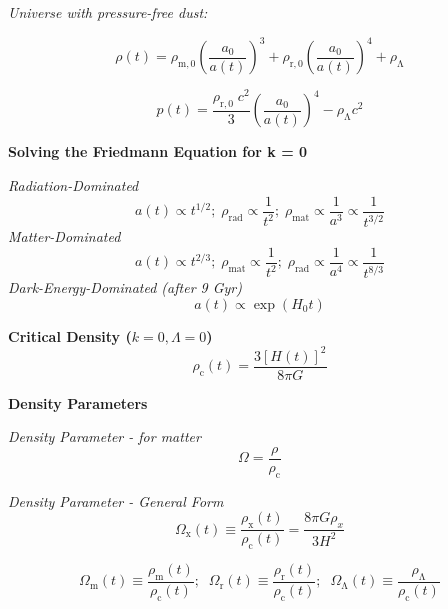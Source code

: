 \documentclass{article}
\begin{document}
\textit {Universe with pressure-free dust:}

\begin{equation}
\rho(t) = \rho_\mathrm{m,0} \left( \frac {a_\mathrm{0}}{a(t)} \right)^3 + \rho_\mathrm{r,0} \left( \frac {a_\mathrm{0}}{a(t)} \right)^4 + \rho_\mathrm{\Lambda}
\end{equation}

\begin{equation}
p(t) = \frac {\rho_\mathrm{r,0} \; c^2}{3} \left( \frac {a_\mathrm{0}}{a(t)} \right)^4 - \rho_\mathrm{\Lambda} c^2
\end{equation}

\textbf {Solving the Friedmann Equation for k = 0}

\textit {Radiation-Dominated}
\begin{equation}
a(t) \propto t^{1/2} ; \; \rho_{\mathrm{rad}} \propto \frac {1}{t^2} ; \; \rho_{\mathrm{mat}} \propto \frac {1}{a^3} \propto \frac {1}{t^{3/2}}
\end{equation}
\textit {Matter-Dominated}
\begin{equation}
a(t) \propto t^{2/3} ; \; \rho_{\mathrm{mat}} \propto \frac {1}{t^2} ; \; \rho_{\mathrm{rad}} \propto \frac {1}{a^4} \propto \frac {1}{t^{8/3}}
\end{equation}
\textit {Dark-Energy-Dominated (after 9 Gyr)}
\begin{equation}
a(t) \propto \exp{(H_\mathrm{0}t)}
\end{equation}


\textbf {Critical Density (\( k = 0, \Lambda = 0 \))}
\begin{equation}
\rho_\mathrm{c}(t) = \frac {{3[H(t)]^2}}{8 \pi G}
\end{equation}

\textbf {Density Parameters}

\textit {Density Parameter - for matter}
\begin{equation}
\Omega = \frac {\rho}{\rho_\mathrm{c}}
\end{equation}

\textit {Density Parameter - General Form}
\begin{equation}
\Omega_\mathrm{x}(t) \equiv \frac {\rho_\mathrm{x}(t)}{\rho_\mathrm{c}(t)} = \frac {8 \pi G \rho_x}{3H^2}
\end{equation}

\begin{equation}
\Omega_\mathrm{m}(t) \equiv \frac {\rho_\mathrm{m}(t)}{\rho_\mathrm{c}(t)}; \; \; \Omega_\mathrm{r}(t) \equiv \frac {\rho_\mathrm{r}(t)}{\rho_\mathrm{c}(t)}; \; \; \Omega_\mathrm{\Lambda}(t) \equiv \frac {\rho_\mathrm{\Lambda}}{\rho_\mathrm{c}(t)}
\end{equation}
\begin{center}
\end{center}
\end{document}
